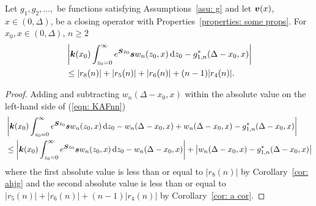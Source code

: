 \begin{cor} \label{cor: aaaaa}
	Let \(g_1,g_2,\dots,\) be functions satisfying Assumptions~\ref{asu: g} and let \({\boldsymbol v}(x)\), \(x\in(0,\Delta)\), be a closing operator with Properties~\ref{properties: some props}. For \(x_0,x\in(0,\Delta)\), \(n\geq 2\)
	\begin{align}
		&\left|\boldsymbol k(x_0) \int_{z_0=0}^\infty e^{\boldsymbol Sz_0}\boldsymbol sw_n(z_0,x)\, \mathrm{d} z_0- g_{1,n}^*(\Delta-x_0,x) \right| \nonumber
		\\&\leq |r_8(n)|+|r_5(n)|+|r_6(n)| + (n-1)|r_4(n)|.\label{eqn: KAFnn}
	\end{align}
\end{cor}
\begin{proof}
	Adding and subtracting \(w_n(\Delta-x_0,x)\) within the absolute value on the left-hand side of (\ref{eqn: KAFnn}) 
	\begin{align*}
		&\left| \boldsymbol k(x_0) \int_{z_0=0}^\infty e^{\boldsymbol Sz_0}\boldsymbol sw_n(z_0,x)\, \mathrm{d} z_0 \nonumber 
		 - w_n(\Delta - x_0,x) + w_n(\Delta - x_0,x) - g_{1,n}^*(\Delta - x_0,x) \right| 
		\\&\leq \left| \boldsymbol k(x_0) \int_{z_0=0}^\infty e^{\boldsymbol Sz_0}\boldsymbol sw_n(z_0,x)\, \mathrm{d} z_0 - w_n(\Delta - x_0,x)\right| + \left| w_n(\Delta - x_0,x) - g_{1,n}^*(\Delta - x_0,x) \right| 
	\end{align*}
	where the first absolute value is less than or equal to \(|r_8(n)|\) by Corollary~\ref{cor: ahjg} and the second absolute value is less than or equal to \(|r_5(n)|+|r_6(n)| + (n-1)|r_4(n)|\) by Corollary~\ref{cor: a cor}.
\end{proof}

